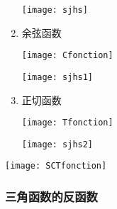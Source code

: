 \documentclass[
  paper=a4,
  pagesize=pdftex,
  twoside=false,
  toc=listof,
  BCOR=0pt,
  DIV=15,
  indent,
]{scrartcl}
\begin{document}
\begin{enumerate}
\begin{minipage}[c]{\linewidth}
  \centering
 \texttt{[image: sjhs]}
\end{minipage}

\item 余弦函数

 

\begin{minipage}[c]{\linewidth}
  \centering
 \texttt{[image: Cfonction]}
\end{minipage}

 

\begin{minipage}[c]{\linewidth}
  \centering
 \texttt{[image: sjhs1]}
\end{minipage}


\item 正切函数

 

\begin{minipage}[c]{\linewidth}
  \centering
 \texttt{[image: Tfonction]}
\end{minipage}

 

\begin{minipage}[c]{\linewidth}
  \centering
 \texttt{[image: sjhs2]}
\end{minipage}

\end{enumerate}

  

\begin{minipage}[c]{\linewidth}
  \centering
 \texttt{[image: SCTfonction]}
\end{minipage}


\subsubsection{三角函数的反函数}
\end{document}
